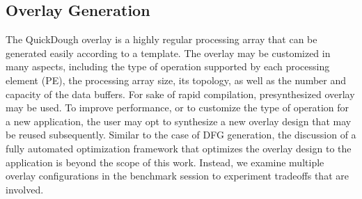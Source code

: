 






\subsection{Overlay Generation}
The QuickDough overlay is a highly regular processing array that can be generated easily according to a template.
The overlay may be customized in many aspects, including the type of operation supported by each processing element (PE), the processing array size, its topology, as well as the number and capacity of the data buffers.
For sake of rapid compilation, presynthesized overlay may be used.
To improve performance, or to customize the type of operation for a new application, the user may opt to synthesize a new overlay design that may be reused subsequently.
Similar to the case of DFG generation, the discussion of a fully automated optimization framework that optimizes the overlay design to the application is beyond the scope of this work.
Instead, we examine multiple overlay configurations in the benchmark session to experiment tradeoffs that are involved.

